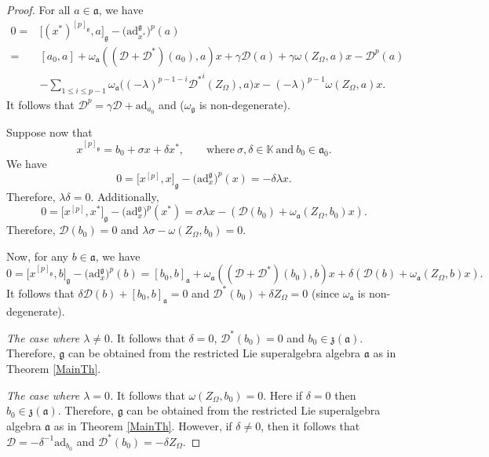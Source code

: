 \documentclass[pdftex]{sigma}
\numberwithin{equation}{section}
\begin{document}
\begin{proof}
For all $a\in \mathfrak{a}$, we have
\begin{align*}
0={}&\big[(x^*)^{[p]_\mathfrak{g}},a\big]_\mathfrak{g}-\bigl(\mathrm{ad}_{x^*}^\mathfrak{g}\bigr)^p(a)\\
 ={}& [a_0,a]+ \omega_\mathfrak{a}(({\mathscr D}+{\mathscr D}^*)(a_0),a)x+\gamma {\mathscr D}(a) +\gamma \omega(Z_\Omega, a)x-{\mathscr D}^{p}(a) \\
 &- \sum_{1\leq i \leq p-1}\omega_\mathfrak{a}\bigl((-\lambda)^{p-1-i} {\mathscr D^*}^{i} (Z_\Omega),a\bigr)x - (-\lambda)^{p-1} \omega(Z_\Omega,a)x.
\end{align*}
It follows that ${\mathscr D}^p=\gamma {\mathscr D} +\mathrm{ad}_{a_0}$ and  ($\omega_\mathfrak{g}$ is non-degenerate).

Suppose now that
\[%
x^{[p]_\mathfrak{g}}=b_0+\sigma x+\delta x^*,\qquad \text{where}\ \sigma,\delta\in \mathbb{K}\ \text{and}\ b_0\in \mathfrak{a}_{\bar 0}.
\]
We have
\[
0=\big[x^{[p]},x\big]_\mathfrak{g}-\bigl(\mathrm{ad}_{x}^\mathfrak{g}\bigr)^p(x)=- \delta \lambda x.
\]
Therefore, $\lambda \delta =0$. Additionally,
\[
0=\big[x^{[p]},x^*\big]_\mathfrak{g}-\bigl(\mathrm{ad}_{x}^\mathfrak{g}\bigr)^p(x^*)= \sigma \lambda x- ({\mathscr D}(b_0)+\omega_\mathfrak{a} (Z_\Omega, b_0)x).
\]
Therefore, ${\mathscr D}(b_0)=0$ and $\lambda \sigma-\omega(Z_\Omega,b_0)=0$.

Now, for any $b\in \mathfrak{a}$, we have
\[
0=\big[x^{[p]_\mathfrak{g}},b\big]_\mathfrak{g}-\bigl(\mathrm{ad}_x^\mathfrak{g}\bigr)^{p}(b)=[b_0,b]_\mathfrak{a}+\omega_\mathfrak{a}(({\mathscr D}+{\mathscr D}^*)(b_0), b)x+ \delta ( {\mathscr D}(b)+ \omega_\mathfrak{a}(Z_\Omega, b)x).
\]
It follows that $\delta {\mathscr D}(b)+[b_0,b]_\mathfrak{a}=0$ and ${\mathscr D}^*(b_0)+ \delta Z_\Omega=0$ (since $\omega_\mathfrak{a}$ is non-degenerate).

\textit{The case where $\lambda\not=0$.} It follows that $\delta=0$, ${\mathscr D}^*(b_0)=0$ and $b_0\in \mathfrak{z}(\mathfrak{a})$. Therefore, $\mathfrak{g}$ can be obtained from the restricted Lie superalgebra algebra $\mathfrak{a}$ as in Theorem \ref{MainTh}.

\textit{The case where $\lambda=0$.} It follows that $\omega(Z_\Omega, b_0)=0$. Here if $\delta=0$ then $b_0\in \mathfrak{z}(\mathfrak{a})$. Therefore, $\mathfrak{g}$ can be obtained from the restricted Lie superalgebra algebra $\mathfrak{a}$ as in Theorem \ref{MainTh}. However, if $\delta\not =0$, then it follows that ${\mathscr D}=-\delta^{-1} \mathrm{ad}_{b_0}$ and ${\mathscr D}^*(b_0)=-\delta Z_\Omega$.
\end{proof}
\end{document}
